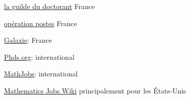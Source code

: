 

\href{http://guilde.jeunes-chercheurs.org/}{la guilde du doctorant} France

\href{http://postes.smai.emath.fr/}{opération postes} France

\href{https://www.galaxie.enseignementsup-recherche.gouv.fr/ensup/candidats.html}{Galaxie}: France

\href{http://www.phds.org/}{Phds.org}: international

\href{https://www.mathjobs.org/jobs}{MathJobs}: international

\href{http://notable.math.ucdavis.edu/wiki/Mathematics_Jobs_Wiki}{Mathematics Jobs Wiki} principalement
pour les \'Etats-Unis